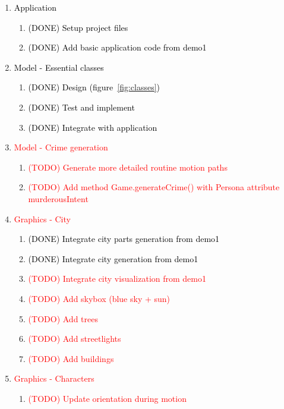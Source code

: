 \documentclass[a4paper, twoside]{article}
\begin{document}
\begin{enumerate}
	\item{} \textcolor{black}{Application} \begin{enumerate}
		\item{} \textcolor{black}{(DONE) Setup project files}
		\item{} \textcolor{black}{(DONE) Add basic application code from demo1}
	\end{enumerate}
	\item{} \textcolor{black}{Model - Essential classes} \begin{enumerate}
		\item{} \textcolor{black}{(DONE) Design (figure~\ref{fig:classes})}
		\item{} \textcolor{black}{(DONE) Test and implement}
		\item{} \textcolor{black}{(DONE) Integrate with application}
	\end{enumerate}
	\item{} \textcolor{red}{Model - Crime generation} \begin{enumerate}
		\item{} \textcolor{red}{(TODO) Generate more detailed routine motion paths}
		\item{} \textcolor{red}{(TODO) Add method Game.generateCrime() with Persona attribute murderousIntent}
	\end{enumerate}
	\item{} \textcolor{red}{Graphics - City} \begin{enumerate}
		\item{} \textcolor{black}{(DONE) Integrate city parts generation from demo1}
		\item{} \textcolor{black}{(DONE) Integrate city generation from demo1}
		\item{} \textcolor{red}{(TODO) Integrate city visualization from demo1}
		\item{} \textcolor{red}{(TODO) Add skybox (blue sky + sun)}
		\item{} \textcolor{red}{(TODO) Add trees}
		\item{} \textcolor{red}{(TODO) Add streetlights}
		\item{} \textcolor{red}{(TODO) Add buildings}
	\end{enumerate}
	\item{} \textcolor{red}{Graphics - Characters} \begin{enumerate}
		\item{} \textcolor{red}{(TODO) Update orientation during motion}

\end{enumerate}
\end{enumerate}
\end{document}
